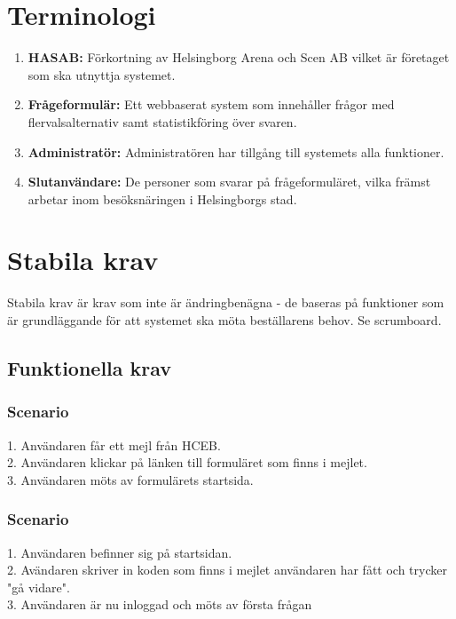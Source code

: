 \documentclass{article}
\begin{document}
    \section{Terminologi}
    \begin{enumerate}
        \item \textbf{HASAB:} Förkortning av Helsingborg Arena och Scen AB vilket är företaget som ska utnyttja systemet.
        \item \textbf{Frågeformulär:} Ett webbaserat system som innehåller frågor med flervalsalternativ samt statistikföring över svaren.
        \item \textbf{Administratör:} Administratören har tillgång till systemets alla funktioner.
        \item \textbf{Slutanvändare:}  De personer som svarar på frågeformuläret, vilka främst arbetar inom besöksnäringen i Helsingborgs stad. 
    \end{enumerate}
    
    \section{Stabila krav}
       Stabila krav är krav som inte är ändringbenägna - de baseras på funktioner som är grundläggande för att systemet ska möta beställarens behov. 
    Se scrumboard.
    
    \subsection{Funktionella krav}
    \subsubsection{Scenario}
    1. Användaren får ett mejl från HCEB. \\
    2. Användaren klickar på länken till formuläret som finns i mejlet.\\
    3. Användaren möts av formulärets startsida.\\
    
    \subsubsection{Scenario}
    1. Användaren befinner sig på startsidan. \\
    2. Avändaren skriver in koden som finns i mejlet användaren har fått och trycker "gå vidare". \\
    3. Användaren är nu inloggad och möts av första frågan\\
    
\end{document}
